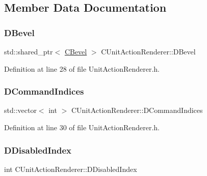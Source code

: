 \subsection{Member Data Documentation}
\hypertarget{classCUnitActionRenderer_a3f4012557f7f4d71cfa02df725984ebb}{}\label{classCUnitActionRenderer_a3f4012557f7f4d71cfa02df725984ebb} 
\subsubsection{\texorpdfstring{D\+Bevel}{DBevel}}
{\footnotesize\ttfamily std\+::shared\+\_\+ptr$<$ \hyperlink{classCBevel}{C\+Bevel} $>$ C\+Unit\+Action\+Renderer\+::\+D\+Bevel\hspace{0.3cm}{\ttfamily [protected]}}



Definition at line 28 of file Unit\+Action\+Renderer.\+h.

\hypertarget{classCUnitActionRenderer_a73eebe87330693c8546ea14c23672859}{}\label{classCUnitActionRenderer_a73eebe87330693c8546ea14c23672859} 
\subsubsection{\texorpdfstring{D\+Command\+Indices}{DCommandIndices}}
{\footnotesize\ttfamily std\+::vector$<$ int $>$ C\+Unit\+Action\+Renderer\+::\+D\+Command\+Indices\hspace{0.3cm}{\ttfamily [protected]}}



Definition at line 30 of file Unit\+Action\+Renderer.\+h.

\hypertarget{classCUnitActionRenderer_abf505a324f367378f8c30ddd48bb6549}{}\label{classCUnitActionRenderer_abf505a324f367378f8c30ddd48bb6549} 
\subsubsection{\texorpdfstring{D\+Disabled\+Index}{DDisabledIndex}}
{\footnotesize\ttfamily int C\+Unit\+Action\+Renderer\+::\+D\+Disabled\+Index\hspace{0.3cm}{\ttfamily [protected]}}



